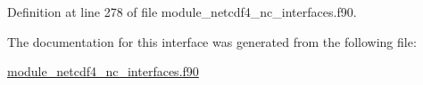 Definition at line 278 of file module\+\_\+netcdf4\+\_\+nc\+\_\+interfaces.\+f90.



The documentation for this interface was generated from the following file\+:\begin{DoxyCompactItemize}
\item 
\hyperlink{module__netcdf4__nc__interfaces_8f90}{module\+\_\+netcdf4\+\_\+nc\+\_\+interfaces.\+f90}\end{DoxyCompactItemize}
